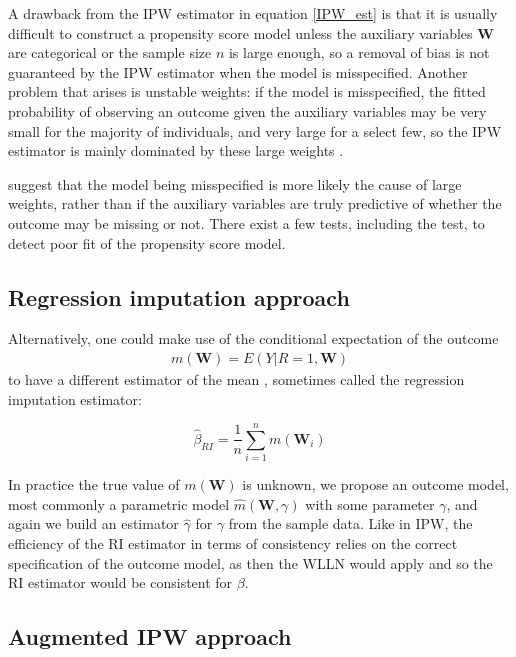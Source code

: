 \documentclass[12pt,twoside]{article}
\begin{document}
A drawback from the IPW estimator in equation \ref{IPW_est} is that it is usually difficult to construct a propensity score model unless the auxiliary variables $\mathbf{W}$ are categorical or the sample size $n$ is large enough, so a removal of bias is not guaranteed by the IPW estimator when the model is misspecified. Another problem that arises is unstable weights: if the model is misspecified, the fitted probability of observing an outcome given the auxiliary variables may be very small for the majority of individuals, and very large for a select few, so the IPW estimator is mainly dominated by these large weights \citep{seaman}.

\citet{kang} suggest that the model being misspecified is more likely the cause of large weights, rather than if the auxiliary variables are truly predictive of whether the outcome may be missing or not. There exist a few tests, including the \citet{hosmer} test, to detect poor fit of the propensity score model.\\

\subsection{Regression imputation approach} 

Alternatively, one could make use of the conditional expectation of the outcome 
\begin{align*}
    m(\mathbf{W}) = E(Y|R= 1,\mathbf{W})
\end{align*}
to have a different estimator of the mean \citep{davidian,vansteelandt}, sometimes called the regression imputation estimator: 

\begin{equation}
    \hat{\beta}_ {RI} = \frac{1}{n}\sum_{i = 1}^n m(\mathbf{W}_i)
\end{equation}

In practice the true value of $m(\mathbf{W})$ is unknown, we propose an outcome model, most commonly a parametric model $\hat m(\mathbf{W}, \gamma)$ with some parameter $\gamma$, and again we build an estimator $\hat{\gamma}$ for $\gamma$ from the sample data. Like in IPW, the efficiency of the RI estimator in terms of consistency relies on the correct specification of the outcome model, as then the WLLN would apply and so the RI estimator would be consistent for $\beta$. \\

\subsection{Augmented IPW approach} 
\end{document}
